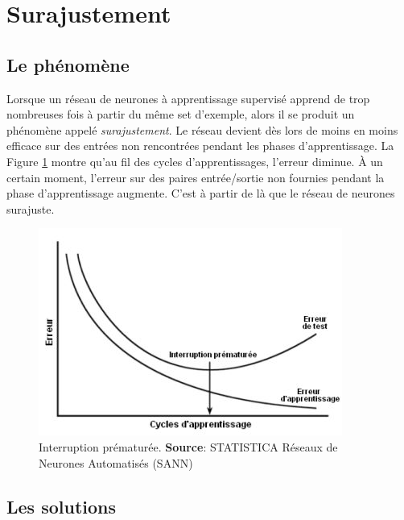 \section{Surajustement}
\subsection{Le phénomène}
Lorsque un réseau de neurones à apprentissage supervisé apprend de trop nombreuses fois à partir du même set d'exemple, alors il se produit un phénomène appelé \emph{surajustement}.\cite{statistica}
Le réseau devient dès lors de moins en moins efficace sur des entrées non rencontrées pendant les phases d'apprentissage.
La Figure \ref{interruption} montre qu'au fil des cycles d'apprentissages, l'erreur diminue.
À un certain moment, l'erreur sur des paires entrée/sortie non fournies pendant la phase d'apprentissage augmente. 
C'est à partir de là que le réseau de neurones surajuste.
\begin{figure}
 \centering
 \includegraphics[scale=0.6]{../figures/surgeneralisation.jpg}
 \caption{Interruption prématurée. \textbf{Source}: STATISTICA Réseaux de Neurones Automatisés (SANN)\cite{statistica}}
 \label{interruption}
\end{figure}
\subsection{Les solutions}
